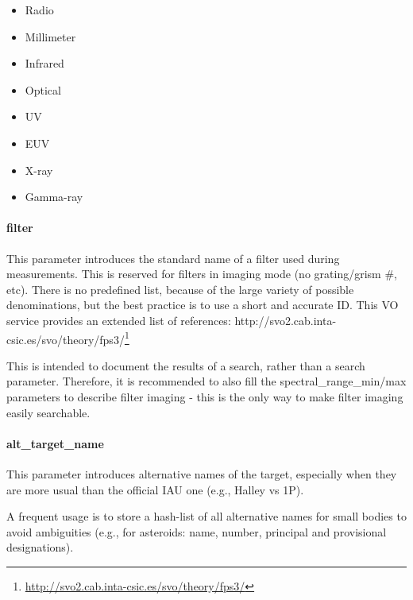 \documentclass[11pt,a4paper]{ivoa}
\begin{document}
\begin{itemize}

\item Radio

\item Millimeter

\item Infrared

\item Optical

\item UV

\item EUV

\item X-ray

\item Gamma-ray

\end{itemize}

\paragraph{filter}

This parameter introduces the standard name of a filter used during measurements. This is reserved for filters in imaging mode (no grating/grism \#, etc). There is no predefined list, because of the large variety of possible denominations, but the best practice is to use a short and accurate ID. This VO service provides an extended list of references: http://svo2.cab.inta-csic.es/svo/theory/fps3/\footnote{\url{http://svo2.cab.inta-csic.es/svo/theory/fps3/}}

This is intended to document the results of a search, rather than a search parameter. Therefore, it is recommended to also fill the spectral\_range\_min/max parameters to describe filter imaging - this is the only way to make filter imaging easily searchable.

\paragraph{alt\_target\_name}

This parameter introduces alternative names of the target, especially when they are more usual than the official IAU one (e.g., Halley vs 1P).

A frequent usage is to store a hash-list of all alternative names for small bodies to avoid ambiguities (e.g., for asteroids: name, number, principal and provisional designations).
\end{document}

